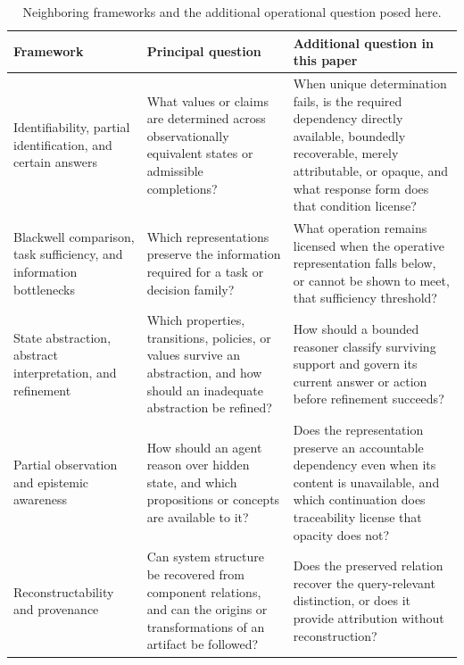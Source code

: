 \documentclass[11pt]{article}
\theoremstyle{definition}
\theoremstyle{remark}
\begin{document}
\begin{table}[p]
\centering
\footnotesize
\renewcommand{\arraystretch}{1.18}
\caption{Neighboring frameworks and the additional operational question
posed here.}
\label{tab:related-work}
\begin{tabular}{
>{\raggedright\arraybackslash}p{}
>{\raggedright\arraybackslash}p{}
>{\raggedright\arraybackslash}p{}}
\toprule
\textbf{Framework}
&
\textbf{Principal question}
&
\textbf{Additional question in this paper}
\\
\midrule

Identifiability, partial identification, and certain answers
&
What values or claims are determined across observationally equivalent states or admissible completions?~\cite{Pearl2009,Manski2003,Manski2008,Libkin2016}
&
When unique determination fails, is the required dependency directly available, boundedly recoverable, merely attributable, or opaque, and what response form does that condition license?
\\

Blackwell comparison, task sufficiency, and information bottlenecks
&
Which representations preserve the information required for a task or decision family?~\cite{Blackwell1953,Tishby1999,Bruhacs2026Projection,
Bruhacs2026Hidden}
&
What operation remains licensed when the operative representation falls below, or cannot be shown to meet, that sufficiency threshold?
\\

State abstraction, abstract interpretation, and refinement
&
Which properties, transitions, policies, or values survive an abstraction, and how should an inadequate abstraction be refined?~\cite{Li2006,CousotCousot1977,Clarke2000CEGAR}
&
How should a bounded reasoner classify surviving support and govern its current answer or action before refinement succeeds?
\\

Partial observation and epistemic awareness
&
How should an agent reason over hidden state, and which propositions or concepts are available to it?~\cite{Kaelbling1998,FaginHalpern1987}
&
Does the representation preserve an accountable dependency even when its content is unavailable, and which continuation does traceability license that opacity does not?
\\

Reconstructability and provenance
&
Can system structure be recovered from component relations, and can the origins or transformations of an artifact be followed?~\cite{KlirWay1985,Klir1986RA,SoilandReyes2022}
&
Does the preserved relation recover the query-relevant distinction, or does it provide attribution without reconstruction?
\\


\end{tabular}
\end{table}
\end{document}
